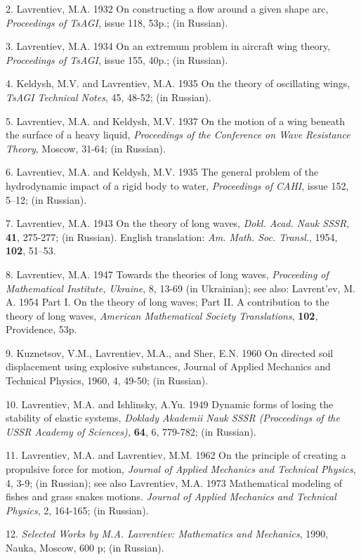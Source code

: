 \documentclass[%
 reprint,
onecolumn,
 amsmath,amssymb, aps,
]{revtex4-2}
\numberwithin{equation}{section}
\begin{document}
2. Lavrentiev, M.A. 1932 On constructing a flow around a given shape arc, \textit{Proceedings of TsAGI}, issue 118, 53p.; (in Russian).

3. Lavrentiev, M.A. 1934 On an extremum problem in aircraft wing theory, \textit{Proceedings of TsAGI}, issue 155, 40p.; (in Russian).

4. Keldysh, M.V. and Lavrentiev, M.A. 1935 On the theory of oscillating wings, \textit{TsAGI Technical Notes}, 45, 48-52; (in Russian).

5. Lavrentiev, M.A. and  Keldysh, M.V. 1937 On the motion of a wing beneath the surface of a heavy liquid,
 \textit{Proceedings of the Conference on Wave Resistance Theory}, Moscow, 31-64; (in Russian).

6. Lavrentiev, M.A. and Keldysh, M.V. 1935 The general problem of the hydrodynamic impact of a rigid body to water, \textit{Proceedings of CAHI}, issue 152, 5–12; (in Russian).

7. Lavrentiev, M.A. 1943 On the theory of long waves, \textit{Dokl. Acad. Nauk SSSR,} \textbf{41}, 275-277; (in Russian).
English translation: \textit{Am. Math. Soc. Transl.}, 1954, \textbf{102}, 51–53.

8. Lavrentiev, M.A. 1947 Towards the theories of long waves, \textit{Proceeding of Mathematical Institute, Ukraine}, 8, 13-69 (in Ukrainian);
see also: Lavrent'ev, M. A. 1954 Part I. On the theory of long waves; Part II. A contribution to the theory of long waves,  \textit{American Mathematical Society Translations}, \textbf{102}, Providence, 53p.

9.	Kuznetsov, V.M., Lavrentiev, M.A., and Sher, E.N. 1960 On directed soil displacement using explosive substances,
Journal of Applied Mechanics and Technical Physics, 1960, 4, 49-50; (in Russian).

10.	 Lavrentiev, M.A. and Ishlinsky, A.Yu. 1949 Dynamic forms of losing the stability of elastic systems, \textit{Doklady Akademii Nauk SSSR (Proceedings of the USSR Academy of Sciences),} \textbf{64}, 6, 779-782; (in Russian).

11.	Lavrentiev, M.A. and Lavrentiev, M.M. 1962 On the principle of creating a propulsive force for motion, \textit{Journal of Applied Mechanics and Technical Physics}, 4, 3-9; (in Russian); see also  Lavrentiev, M.A. 1973 Mathematical modeling of fishes and grass snakes motions. \textit{Journal of Applied Mechanics and Technical Physics}, 2, 164-165; (in Russian).

12. \textit{Selected Works by M.A. Lavrentiev: Mathematics and Mechanics}, 1990, Nauka, Moscow, 600 p; (in Russian).
\end{document}
